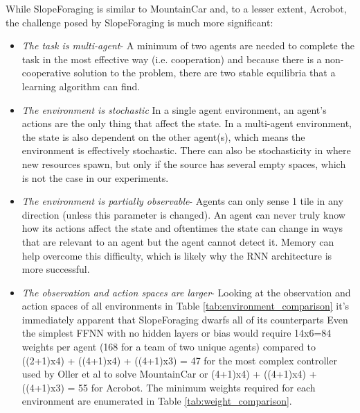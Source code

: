 \documentclass[12pt]{article}
\begin{document}
While SlopeForaging is similar to MountainCar and, to a lesser extent, Acrobot, the challenge posed by SlopeForaging is much more significant:

\begin{itemize}

\item \textit{The task is multi-agent}- A minimum of two agents are needed to complete the task in the most effective way (i.e. cooperation) and because there is a non-cooperative solution to the problem, there are two stable equilibria that a learning algorithm can find.

\item \textit{The environment is stochastic} In a single agent environment, an agent's actions are the only thing that affect the state.
In a multi-agent environment, the state is also dependent on the other agent(s), which means the environment is effectively stochastic.
There can also be stochasticity in where new resources spawn, but only if the source has several empty spaces, which is not the case in our experiments.

\item \textit{The environment is partially observable}- Agents can only sense 1 tile in any direction (unless this parameter is changed).
An agent can never truly know how its actions affect the state and oftentimes the state can change in ways that are relevant to an agent but the agent cannot detect it.
Memory can help overcome this difficulty, which is likely why the RNN architecture is more successful.

\item \textit{The observation and action spaces are larger}- Looking at the observation and action spaces of all environments in Table \ref{tab:environment_comparison} it's immediately apparent that SlopeForaging dwarfs all of its counterparts
Even the simplest FFNN with no hidden layers or bias would require 14x6=84 weights per agent (168 for a team of two unique agents) compared to ((2+1)x4) + ((4+1)x4) + ((4+1)x3) = 47 for the most complex controller used by Oller et al to solve MountainCar or (4+1)x4) + ((4+1)x4) + ((4+1)x3) = 55 for Acrobot.
The minimum weights required for each environment are enumerated in Table \ref{tab:weight_comparison}.

\end{itemize}
\end{document}

